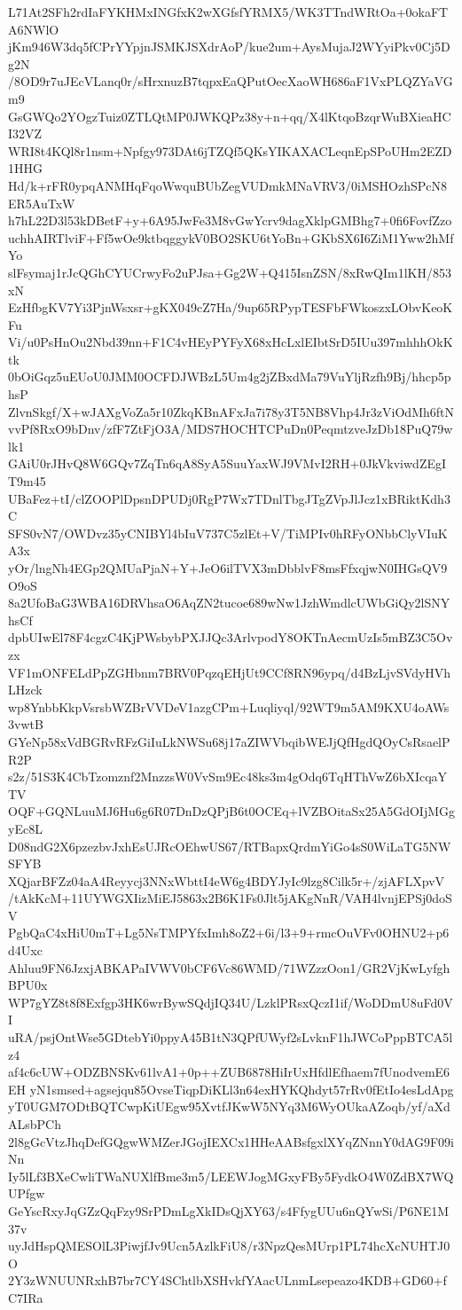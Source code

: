 L71At2SFh2rdIaFYKHMxINGfxK2wXGfsfYRMX5/WK3TTndWRtOa+0okaFTA6NWlO
jKm946W3dq5fCPrYYpjnJSMKJSXdrAoP/kue2um+AysMujaJ2WYyiPkv0Cj5Dg2N
/8OD9r7uJEcVLanq0r/sHrxnuzB7tqpxEaQPutOecXaoWH686aF1VxPLQZYaVGm9
GsGWQo2YOgzTuiz0ZTLQtMP0JWKQPz38y+n+qq/X4lKtqoBzqrWuBXieaHCI32VZ
WRI8t4KQl8r1nsm+Npfgy973DAt6jTZQf5QKsYIKAXACLeqnEpSPoUHm2EZD1HHG
Hd/k+rFR0ypqANMHqFqoWwquBUbZegVUDmkMNaVRV3/0iMSHOzhSPcN8ER5AuTxW
h7hL22D3l53kDBetF+y+6A95JwFe3M8vGwYcrv9dagXklpGMBhg7+0fi6FovfZzo
uchhAIRTlviF+Ff5wOe9ktbqggykV0BO2SKU6tYoBn+GKbSX6I6ZiM1Yww2hMfYo
slFsymaj1rJcQGhCYUCrwyFo2uPJsa+Gg2W+Q415IsnZSN/8xRwQIm1lKH/853xN
EzHfbgKV7Yi3PjnWsxsr+gKX049cZ7Ha/9up65RPypTESFbFWkoszxLObvKeoKFu
Vi/u0PsHnOu2Nbd39nn+F1C4vHEyPYFyX68xHcLxlEIbtSrD5IUu397mhhhOkKtk
0bOiGqz5uEUoU0JMM0OCFDJWBzL5Um4g2jZBxdMa79VuYljRzfh9Bj/hhcp5phsP
ZlvnSkgf/X+wJAXgVoZa5r10ZkqKBnAFxJa7i78y3T5NB8Vhp4Jr3zViOdMh6ftN
vvPf8RxO9bDnv/zfF7ZtFjO3A/MDS7HOCHTCPuDn0PeqmtzveJzDb18PuQ79wlk1
GAiU0rJHvQ8W6GQv7ZqTn6qA8SyA5SuuYaxWJ9VMvI2RH+0JkVkviwdZEgIT9m45
UBaFez+tI/clZOOPlDpsnDPUDj0RgP7Wx7TDnlTbgJTgZVpJlJcz1xBRiktKdh3C
SFS0vN7/OWDvz35yCNIBYl4bIuV737C5zlEt+V/TiMPIv0hRFyONbbClyVIuKA3x
yOr/lngNh4EGp2QMUaPjaN+Y+JeO6ilTVX3mDbblvF8msFfxqjwN0IHGsQV9O9oS
8a2UfoBaG3WBA16DRVhsaO6AqZN2tucoe689wNw1JzhWmdlcUWbGiQy2lSNYhsCf
dpbUIwEl78F4cgzC4KjPWsbybPXJJQc3ArlvpodY8OKTnAecmUzIs5mBZ3C5Ovzx
VF1mONFELdPpZGHbnm7BRV0PqzqEHjUt9CCf8RN96ypq/d4BzLjvSVdyHVhLHzck
wp8YnbbKkpVsrsbWZBrVVDeV1azgCPm+Luqliyql/92WT9m5AM9KXU4oAWs3vwtB
GYeNp58xVdBGRvRFzGiIuLkNWSu68j17aZIWVbqibWEJjQfHgdQOyCsRsaelPR2P
s2z/51S3K4CbTzomznf2MnzzsW0VvSm9Ec48ks3m4gOdq6TqHThVwZ6bXIcqaYTV
OQF+GQNLuuMJ6Hu6g6R07DnDzQPjB6t0OCEq+lVZBOitaSx25A5GdOIjMGgyEc8L
D08ndG2X6pzezbvJxhEsUJRcOEhwUS67/RTBapxQrdmYiGo4sS0WiLaTG5NWSFYB
XQjarBFZz04aA4Reyycj3NNxWbttI4eW6g4BDYJyIc9lzg8Cilk5r+/zjAFLXpvV
/tAkKcM+11UYWGXIizMiEJ5863x2B6K1Fs0Jlt5jAKgNnR/VAH4lvnjEPSj0doSV
PgbQaC4xHiU0mT+Lg5NsTMPYfxImh8oZ2+6i/l3+9+rmcOuVFv0OHNU2+p6d4Uxc
Ahluu9FN6JzxjABKAPaIVWV0bCF6Vc86WMD/71WZzzOon1/GR2VjKwLyfghBPU0x
WP7gYZ8t8f8Exfgp3HK6wrBywSQdjIQ34U/LzklPRsxQczI1if/WoDDmU8uFd0VI
uRA/psjOntWse5GDtebYi0ppyA45B1tN3QPfUWyf2sLvknF1hJWCoPppBTCA5lz4
af4c6cUW+ODZBNSKv61lvA1+0p++ZUB6878HiIrUxHfdlEfhaem7fUnodvemE6EH
yN1smsed+agsejqu85OvseTiqpDiKLl3n64exHYKQhdyt57rRv0fEtIo4esLdApg
yT0UGM7ODtBQTCwpKiUEgw95XvtfJKwW5NYq3M6WyOUkaAZoqb/yf/aXdALsbPCh
2l8gGcVtzJhqDefGQgwWMZerJGojIEXCx1HHeAABsfgxlXYqZNnnY0dAG9F09iNn
Iy5lLf3BXeCwliTWaNUXlfBme3m5/LEEWJogMGxyFBy5FydkO4W0ZdBX7WQUPfgw
GeYscRxyJqGZzQqFzy9SrPDmLgXkIDsQjXY63/s4FfygUUu6nQYwSi/P6NE1M37v
uyJdHspQMESOlL3PiwjfJv9Ucn5AzlkFiU8/r3NpzQesMUrp1PL74hcXcNUHTJ0O
2Y3zWNUUNRxhB7br7CY4SChtlbXSHvkfYAacULnmLsepeazo4KDB+GD60+fC7IRa
